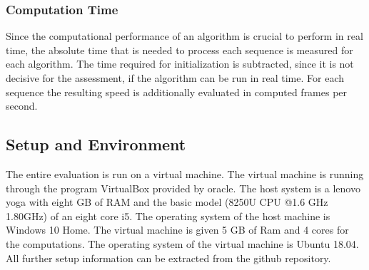 \subsubsection{Computation Time}
	
	Since the computational performance of an algorithm is crucial to perform in real time, the absolute time that is needed to process each 
	sequence is measured for each algorithm. The time required for initialization is subtracted, since it is not decisive for the assessment, 
	if the algorithm can be run in real time. For each sequence the resulting speed is additionally evaluated in computed frames per second. 
	
\subsection{Setup and Environment}

	
	The entire evaluation is run on a virtual machine. The virtual machine is running through the program VirtualBox provided by oracle.
	The host system is a lenovo yoga with eight GB of RAM and the basic model (8250U CPU @1.6 
	GHz 1.80GHz) of an eight core i5. The operating system of the host machine is Windows 10 Home. The virtual
	machine is given 5 GB of Ram and 4 cores for the computations. The operating system of the virtual machine is Ubuntu 18.04. All further setup information can be extracted 
	from the github repository.

